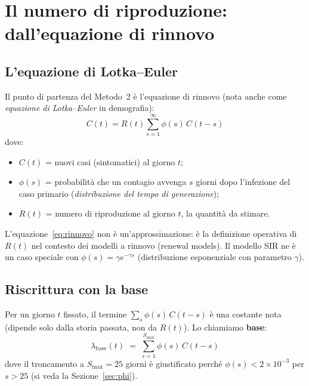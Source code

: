 \documentclass[12pt,a4paper]{article}
\newcommand{\lbase}{\lambda_{\mathrm{base}}}
\newcommand{\Smax}{S_{\max}}
\begin{document}
\section{Il numero di riproduzione: dall'equazione di rinnovo}

\subsection{L'equazione di Lotka--Euler}

Il punto di partenza del Metodo~2 è l'equazione di rinnovo (nota anche come
\emph{equazione di Lotka--Euler} in demografia):
\begin{equation}
  C(t) = R(t) \sum_{s=1}^{\infty} \phi(s)\, C(t-s)
  \label{eq:rinnovo}
\end{equation}
dove:
\begin{itemize}
  \item $C(t)$ = nuovi casi (sintomatici) al giorno $t$;
  \item $\phi(s)$ = probabilità che un contagio avvenga $s$ giorni dopo l'infezione
        del caso primario (\emph{distribuzione del tempo di generazione});
  \item $R(t)$ = numero di riproduzione al giorno $t$, la quantità da stimare.
\end{itemize}

\begin{osservazione}
L'equazione~\eqref{eq:rinnovo} non è un'approssimazione: è la definizione operativa
di $R(t)$ nel contesto dei modelli a rinnovo (renewal models). Il modello SIR ne è
un caso speciale con $\phi(s) = \gamma e^{-\gamma s}$ (distribuzione esponenziale
con parametro $\gamma$).
\end{osservazione}

\subsection{Riscrittura con la base}

Per un giorno $t$ fissato, il termine $\sum_s \phi(s)\,C(t-s)$ è una costante nota
(dipende solo dalla storia passata, non da $R(t)$). Lo chiamiamo \textbf{base}:
\begin{equation}
  \lbase(t) \;=\; \sum_{s=1}^{\Smax} \phi(s)\, C(t-s)
  \label{eq:lbase}
\end{equation}
dove il troncamento a $\Smax = 25$ giorni è giustificato perché $\phi(s) < 2 \times 10^{-3}$
per $s > 25$ (si veda la Sezione~\ref{sec:phi}).
\end{document}

